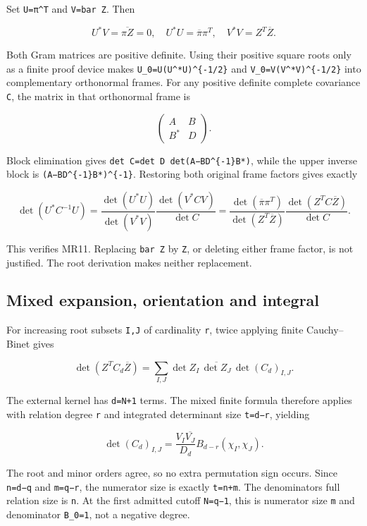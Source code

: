 \documentclass[11pt]{article}
\begin{document}
Set \texttt{U=π\^{}T} and \texttt{V=bar\ Z}. Then

\[
U^*V=\overline{\pi Z}=0,
\quad U^*U=\overline\pi\pi^T,
\quad V^*V=Z^T\overline Z.
\]

Both Gram matrices are positive definite. Using their positive square roots only as a finite proof device makes \texttt{U\_0=U(U\^{}*U)\^{}\{-1/2\}} and \texttt{V\_0=V(V\^{}*V)\^{}\{-1/2\}} into complementary orthonormal frames. For any positive definite complete covariance \texttt{C}, the matrix in that orthonormal frame is

\[
\begin{pmatrix}A&B\\B^*&D\end{pmatrix}.
\]

Block elimination gives \texttt{det\ C=det\ D\ det(A−BD\^{}\{-1\}B*)}, while the upper inverse block is \texttt{(A−BD\^{}\{-1\}B*)\^{}\{-1\}}. Restoring both original frame factors gives exactly

\[
\det(U^*C^{-1}U)
=\frac{\det(U^*U)}{\det(V^*V)}
  \frac{\det(V^*CV)}{\det C}
=\frac{\det(\overline\pi\pi^T)}{\det(Z^T\overline Z)}
  \frac{\det(Z^TC\overline Z)}{\det C}.
\]

This verifies MR11. Replacing \texttt{bar\ Z} by \texttt{Z}, or deleting either frame factor, is not justified. The root derivation makes neither replacement.

\subsection{Mixed expansion, orientation and integral}\label{mixed-expansion-orientation-and-integral}

For increasing root subsets \texttt{I,J} of cardinality \texttt{r}, twice applying finite Cauchy--Binet gives

\[
\det(Z^TC_d\overline Z)
=\sum_{I,J}\det Z_I\,\overline{\det Z_J}\,
  \det(C_d)_{I,J}.
\]

The external kernel has \texttt{d=N+1} terms. The mixed finite formula therefore applies with relation degree \texttt{r} and integrated determinant size \texttt{t=d−r}, yielding

\[
\det(C_d)_{I,J}
=\frac{V_I\overline{V_J}}{D_d}
 B_{d-r}(\chi_I,\chi_J).
\]

The root and minor orders agree, so no extra permutation sign occurs. Since \texttt{n=d−q} and \texttt{m=q−r}, the numerator size is exactly \texttt{t=n+m}. The denominator\textquotesingle s full relation size is \texttt{n}. At the first admitted cutoff \texttt{N=q−1}, this is numerator size \texttt{m} and denominator \texttt{B\_0=1}, not a negative degree.
\end{document}
